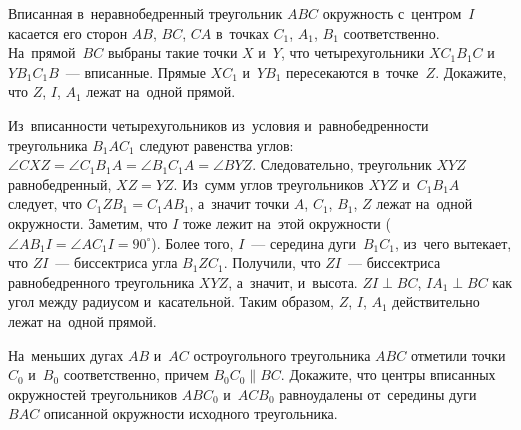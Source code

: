 \begin{problems}

\item
Вписанная в~неравнобедренный треугольник $ABC$ окружность с~центром~$I$
касается его сторон $AB$, $BC$, $CA$ в~точках $C_1$, $A_1$, $B_1$
соответственно.
На~прямой~$BC$ выбраны такие точки $X$ и~$Y$, что четырехугольники
$X C_1 B_1C$ и $Y B_1 C_1B$~--- вписанные.
Прямые $X C_1$ и~$Y B_1$ пересекаются в~точке~$Z$.
Докажите, что $Z$, $I$, $A_1$ лежат на~одной прямой.

\end{problems}

\ifincludesolutions
Из~вписанности четырехугольников из~условия и~равнобедренности треугольника
$B_1 A C_1$ следуют равенства углов:
$\angle CXZ = \angle C_1 B_1 A = \angle B_1 C_1 A = \angle BYZ$.
Следовательно, треугольник $XYZ$ равнобедренный, $XZ = YZ$.
Из~сумм углов треугольников $XYZ$ и~$C_1 B_1 A$ следует, что
$C_1 Z B_1 = C_1 A B_1$, а~значит точки $A$, $C_1$, $B_1$, $Z$ лежат на~одной
окружности.
Заметим, что $I$ тоже лежит на~этой окружности
($\angle A B_1 I = \angle A C_1 I = 90^{\circ}$).
Более того, $I$~--- середина дуги~$B_1 C_1$, из~чего вытекает,
что $ZI$~--- биссектриса угла $B_1 Z C_1$.
Получили, что $ZI$~--- биссектриса равнобедренного треугольника $XYZ$,
а~значит, и~высота.
$ZI \perp BC$, $I A_1 \perp BC$ как угол между радиусом и~касательной.
Таким образом, $Z$, $I$, $A_1$ действительно лежат на~одной прямой.
\fi %

\begin{problems}

\item
На~меньших дугах $AB$ и~$AC$ остроугольного треугольника $ABC$ отметили
точки $C_0$ и~$B_0$ соответственно, причем $B_0 C_0 \parallel BC$.
Докажите, что центры вписанных окружностей треугольников $A B C_0$ и~$A C B_0$
равноудалены от~середины дуги $BAC$ описанной окружности исходного
треугольника.

\end{problems}


